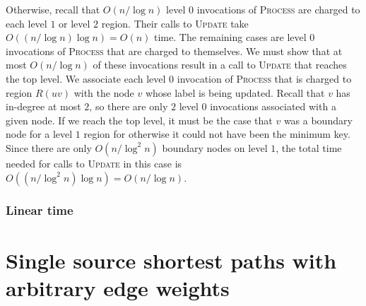 \documentclass[12pt]{article}
\begin{document}
Otherwise, recall that $O(n/\log n)$ level $0$ invocations of \textsc{Process} are charged to each level $1$ or level $2$ region. Their calls to \textsc{Update} take $O((n/\log n) \log n) = O(n)$ time. The remaining cases are level $0$ invocations of \textsc{Process} that are charged to themselves. We must show that at most $O(n/\log n)$ of these invocations result in a call to \textsc{Update} that reaches the top level. We associate each level $0$ invocation of \textsc{Process} that is charged to region $R(uv)$ with the node $v$ whose label is being updated. Recall that $v$ has in-degree at most $2$, so there are only $2$ level $0$ invocations associated with a given node. If we reach the top level, it must be the case that $v$ was a boundary node for a level $1$ region for otherwise it could not have been the minimum key. Since there are only $O(n/\log^2 n)$ boundary nodes on level $1$, the total time needed for calls to \textsc{Update} in this case is $O((n/\log^2 n) \log n) = O(n/\log n)$.

\subsubsection{Linear time}
\label{sec:linear-time}



\section{Single source shortest paths with arbitrary edge weights}
\label{sec:arbitr-edge-weights}




\end{document}
